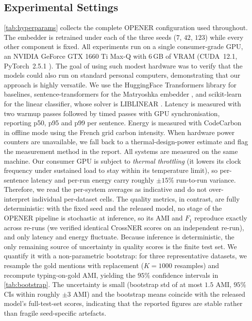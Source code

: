 \documentclass[pdflatex,sn-basic,Numbered]{sn-jnl}
\begin{document}
\subsection{Experimental Settings}
\label{sec:exp:impl}
{\autoref{tab:hyperparams} collects the complete OPENER configuration used throughout. The embedder is retrained under each of the three seeds ($7$, $42$, $123$) while every other component is fixed.}
All experiments run on a single consumer-grade GPU, an NVIDIA GeForce GTX 1660 Ti Max-Q with $6$\,GB of VRAM (CUDA~12.1, PyTorch~2.5.1 \cite{paszke2019pytorch}). The goal of using such modest hardware was to verify that the models could also run on standard personal computers, demonstrating that our approach is highly versatile.
We use the HuggingFace Transformers library \cite{wolf2020transformers} for baselines, sentence-transformers \cite{reimers2019sbert} for the Matryoshka embedder \cite{nussbaum2024nomic, kusupati2022matryoshka}, and scikit-learn \cite{pedregosa2011scikit} for the linear classifier, whose solver is LIBLINEAR \cite{fan2008liblinear}.
Latency is measured with two warmup passes followed by timed passes with GPU synchronisation, reporting p50, p95 and p99 per sentence.
Energy is measured with CodeCarbon \cite{luccioni2019quantifying} in offline mode using the French grid carbon intensity. When hardware power counters are unavailable, we fall back to a thermal-design-power estimate and flag the measurement method in the report.
All systems are measured on the same machine. Our consumer GPU is subject to \emph{thermal throttling} (it lowers its clock frequency under sustained load to stay within its temperature limit), so per-sentence latency and per-run energy carry roughly $\pm15\%$ run-to-run variance. Therefore, we read the per-system averages as indicative and do not over-interpret individual per-dataset cells.
The quality metrics, in contrast, are fully deterministic: with the fixed seed and the released model, no stage of the OPENER pipeline is stochastic at inference, so its AMI and $F_1$ reproduce exactly across re-runs (we verified identical CrossNER scores on an independent re-run), and only latency and energy fluctuate.
Because inference is deterministic, the only remaining source of uncertainty in quality scores is the finite test set. We quantify it with a non-parametric bootstrap: for three representative datasets, we resample the gold mentions with replacement ($K{=}1000$ resamples) and recompute typing-on-gold AMI, yielding the $95\%$ confidence intervals in \autoref{tab:bootstrap}. The uncertainty is small (bootstrap std of at most $1.5$ AMI, $95\%$ CIs within roughly $\pm 3$ AMI) and the bootstrap means coincide with the released model's full-test-set scores, indicating that the reported figures are stable rather than fragile seed-specific artefacts.
\end{document}
